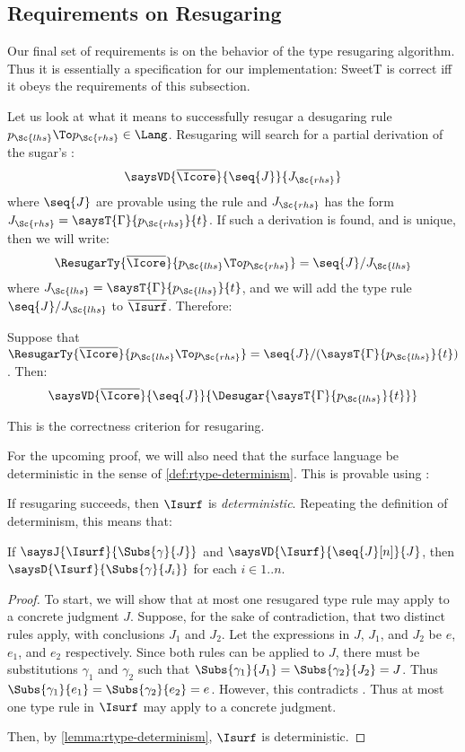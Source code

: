 \subsection{Requirements on Resugaring}\label{sec:rtype-req-resugar}

Our final set of requirements is on the behavior of the type
resugaring algorithm. Thus it is essentially a specification for our
implementation: {SweetT} is correct iff it obeys the requirements of
this subsection.

Let us look at what it means to successfully resugar a desugaring rule
$p_\Sc{lhs} \To p_\Sc{rhs} \in \Lang$.
Resugaring will search for a partial derivation of the sugar's :
\[ \saysVD{\overline{\Icore}}{\seq{J}}{J_\Sc{rhs}} \]
where $\seq{J}$ are provable using the  rule and
$J_\Sc{rhs}$ has the form $J_\Sc{rhs} = \saysT{\Gamma}{p_\Sc{rhs}}{t}$.
If such a derivation is found, and is unique, then we will write:
\[ \ResugarTy{\overline{\Icore}}{p_\Sc{lhs} \To p_\Sc{rhs}}
 = \seq{J} / J_\Sc{lhs} \]
where $J_\Sc{lhs} = \saysT{\Gamma}{p_\Sc{lhs}}{t}$,
and we will add the type rule $\seq{J} / J_\Sc{lhs}$ to $\overline{\Isurf}$. Therefore:

\begin{assumption}[Resugaring]
  \label{assumption:rtype-resugaring}
  Suppose that \newline
  $\ResugarTy{\overline{\Icore}}{p_\Sc{lhs} \To p_\Sc{rhs}}
  = \seq{J} / (\saysT{\Gamma}{p_\Sc{lhs}}{t})$.
  Then:
  \[ \saysVD{\overline{\Icore}}{\seq{J}}{\Desugar{\saysT{\Gamma}{p_\Sc{lhs}}{t}}} \]
\end{assumption}
\noindent
This is the correctness criterion for resugaring.

For the upcoming proof, we will also need that the surface language be
deterministic in the sense of \cref{def:rtype-determinism}. This is provable
using :

\begin{lemma}
  \label{lemma:rtype-surface-determinism}
  If resugaring succeeds, then $\Isurf$ is \emph{deterministic}.
  Repeating the definition of determinism, this means that:

  If $\saysJ{\Isurf}{\Subs{\gamma}{J}}$
  and $\saysVD{\Isurf}{\seq{J}[n]}{J}$,
  then $\saysD{\Isurf}{\Subs{\gamma}{J_i}}$ for each $i \in 1..n$.
\end{lemma}
\begin{proof}
  To start, we will show that at most one resugared type rule may
  apply to a concrete judgment $J$. Suppose, for the sake of
  contradiction, that two distinct rules apply, with conclusions $J_1$
  and $J_2$. Let the expressions in $J$, $J_1$, and $J_2$ be $e$,
  $e_1$, and $e_2$ respectively. Since both rules can be applied to
  $J$, there must be substitutions $\gamma_1$ and $\gamma_2$ such that
  $\Subs{\gamma_1}{J_1} = \Subs{\gamma_2}{J_2} = J$. Thus
  $\Subs{\gamma_1}{e_1} = \Subs{\gamma_2}{e_2} = e$. However, this
  contradicts . Thus at most one type rule
  in $\Isurf$ may apply to a concrete judgment.

  Then, by \cref{lemma:rtype-determinism}, $\Isurf$ is deterministic.
\end{proof}



